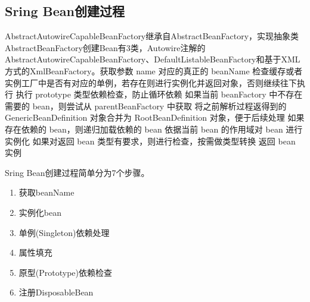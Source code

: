 \documentclass[../../../interview-questions.tex]{subfiles}
\begin{document}
\subsection{Sring Bean创建过程}

AbstractAutowireCapableBeanFactory继承自AbstractBeanFactory，实现抽象类AbstractBeanFactory创建Bean有3类，Autowire注解的AbstractAutowireCapableBeanFactory、DefaultListableBeanFactory和基于XML方式的XmlBeanFactory。获取参数 name 对应的真正的 beanName
检查缓存或者实例工厂中是否有对应的单例，若存在则进行实例化并返回对象，否则继续往下执行
执行 prototype 类型依赖检查，防止循环依赖
如果当前 beanFactory 中不存在需要的 bean，则尝试从 parentBeanFactory 中获取
将之前解析过程返得到的 GenericBeanDefinition 对象合并为 RootBeanDefinition 对象，便于后续处理
如果存在依赖的 bean，则递归加载依赖的 bean
依据当前 bean 的作用域对 bean 进行实例化
如果对返回 bean 类型有要求，则进行检查，按需做类型转换
返回 bean 实例


Sring Bean创建过程简单分为7个步骤。

\begin{enumerate}
\item{获取beanName}
\item{实例化bean}
\item{单例(Singleton)依赖处理}
\item{属性填充}
\item{原型(Prototype)依赖检查}
\item{注册DisposableBean}
\end{enumerate}
\end{document}
